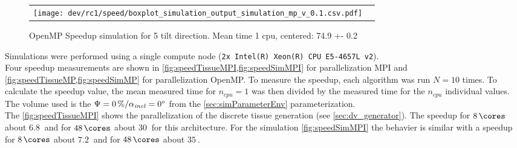 %
\begin{figure}[!t]
\centering
%
\begin{lrbox}{\newtable}
\end{lrbox}
%
\begin{tabular}{cc}
\begin{minipage}{0.6\textwidth}
\texttt{[image: dev/rc1/speed/boxplot\_simulation\_output\_simulation\_mp\_v\_0.1.csv.pdf]}
\end{minipage}
&
\begin{minipage}{0.25\textwidth}
\usebox{\newtable}
\end{minipage}
\end{tabular}
\caption[]{OpenMP Speedup simulation for 5 tilt direction. Mean time 1 cpu, centered: 74.9 +- 0.2}
\label{fig:speedSimMP}
\end{figure}
%
Simulations were performed using a single compute node (\texttt{2x Intel(R) Xeon(R) CPU E5-4657L v2}).
\\
%
Four speedup measurements are shown in \cref{fig:speedTissueMPI,fig:speedSimMPI} for parallelization \ac{MPI} and \cref{fig:speedTissueMP,fig:speedSimMP} for parallelization \ac{OpenMP}.
To measure the speedup, each algorithm was run $N=10$ times.
To calculate the speedup value, the mean measured time for $n_\mathit{cpu}=1$ was then divided by the measured time for the $n_\mathit{cpu}$ individual values.
The volume used is the $\textnormal{$\Psi$}=\SI{0}{\percent} / \textnormal{$\alpha_{\mathit{incl}}$}=\SI{0}{\degree}$ from the \cref{sec:simParameterEnv} parameterization.
\\
%
The \cref{fig:speedTissueMPI} shows the parallelization of the discrete tissue generation (see \cref{sec:dv_generator}).
The speedup for $\SI{8}{\cores}$ about $\SI{6.8}{}$ and for $\SI{48}{\cores}$ about $\SI{30}{}$ for this architecture.
For the simulation \cref{fig:speedSimMPI} the behavier is similar with a speedup for $\SI{8}{\cores}$ about $\SI{7.2}{}$ and for $\SI{48}{\cores}$ about $\SI{35}{}$.
